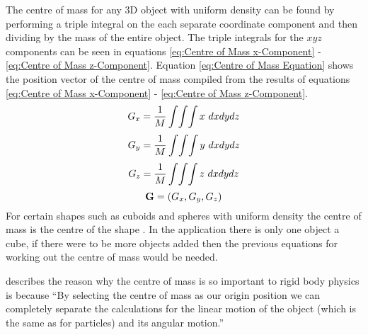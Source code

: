 The centre of mass for any 3D object with uniform density can be found by performing a triple integral on the each separate coordinate component and then dividing by the mass of the entire object.
The triple integrals for the $xyz$ components can be seen in equations \ref{eq:Centre of Mass x-Component} - \ref{eq:Centre of Mass z-Component}.
Equation \ref{eq:Centre of Mass Equation} shows the position vector of the centre of mass compiled from the results of equations \ref{eq:Centre of Mass x-Component} - \ref{eq:Centre of Mass z-Component}.
\begin{equation} \label{eq:Centre of Mass x-Component}
	\centering
   G_{x}=\frac{1}{M}\int\!\int\!\int x\ dx dy dz
\end{equation}
\begin{equation} \label{eq:Centre of Mass y-Component}
	\centering
   G_{y}=\frac{1}{M}\int\!\int\!\int y\ dx dy dz
\end{equation}
\begin{equation} \label{eq:Centre of Mass z-Component}
	\centering
   G_{z}=\frac{1}{M}\int\!\int\!\int z\ dx dy dz
\end{equation}
\begin{equation} \label{eq:Centre of Mass Equation}
	\centering
   \mathbf{G}=(G_{x},G_{y},G_{z})
\end{equation}
For certain shapes such as cuboids and spheres with uniform density the centre of mass is the centre of the shape \citep{millington2007game}.
In the application there is only one object a cube, if there were to be more objects added then the previous equations for working out the centre of mass would be needed.

\citet{millington2007game} describes the reason why the centre of mass is so important to rigid body physics is because “By selecting the centre of mass as our origin position we can completely separate the calculations for the linear motion of the object (which is the same as for particles) and its angular motion.” 